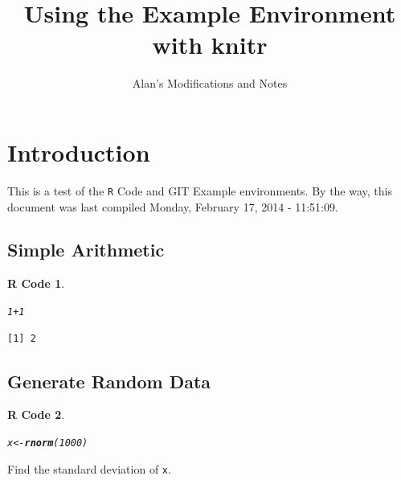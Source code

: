 \documentclass{article}\usepackage[]{graphicx}\usepackage[]{color}
\title{Using the Example Environment with \textbf{knitr}}
\author{Alan's Modifications and Notes}
\makeatletter
\newcommand{\hlnum}[1]{\textcolor[rgb]{0.686,0.059,0.569}{#1}}%
\newcommand{\hlopt}[1]{\textcolor[rgb]{0,0,0}{#1}}%
\newcommand{\hlstd}[1]{\textcolor[rgb]{0.345,0.345,0.345}{#1}}%
\newcommand{\hlkwb}[1]{\textcolor[rgb]{0.69,0.353,0.396}{#1}}%
\newcommand{\hlkwd}[1]{\textcolor[rgb]{0.737,0.353,0.396}{\textbf{#1}}}%
\newenvironment{kframe}{%
 \def\at@end@of@kframe{}%
 \ifinner\ifhmode%
  \def\at@end@of@kframe{\end{minipage}}%
  \begin{minipage}{\columnwidth}%
 \fi\fi%
 \def\FrameCommand##1{\hskip\@totalleftmargin \hskip-\fboxsep
 \colorbox{shadecolor}{##1}\hskip-\fboxsep
     \hskip-\linewidth \hskip-\@totalleftmargin \hskip\columnwidth}%
 \MakeFramed {\advance\hsize-\width
   \@totalleftmargin\z@ \linewidth\hsize
   \@setminipage}}%
 {\par\unskip\endMakeFramed%
 \at@end@of@kframe}
\newenvironment{knitrout}{}{} %
\theoremstyle{rcode}
\newtheorem{rcode}{R Code}[section]
\newcommand{\noind}{\setlength{\parindent}{0pt}}
\makeatother
\begin{document}
\maketitle





\section{Introduction}

This is a test of the \texttt{R} Code and GIT Example environments.  By the way,
this document was last compiled Monday, February 17, 2014 - 11:51:09.

\subsection{Simple Arithmetic}

\begin{knitrout}
\color{fgcolor}\begin{kframe}
\begin{rcode}\label{test-a}\hfill{}\begin{alltt}
\hlnum{1} \hlopt{+} \hlnum{1}
\end{alltt}
\begin{verbatim}
[1] 2
\end{verbatim}
\end{rcode}\end{kframe}
\end{knitrout}



\subsection{Generate Random Data}

\begin{knitrout}
\color{fgcolor}\begin{kframe}
\begin{rcode}\label{test-b}\hfill{}\begin{alltt}
\hlstd{x} \hlkwb{<-} \hlkwd{rnorm}\hlstd{(}\hlnum{1000}\hlstd{)}
\end{alltt}
\end{rcode}\end{kframe}
\end{knitrout}

\noind
Find the standard deviation of \texttt{x}.
\end{document}
